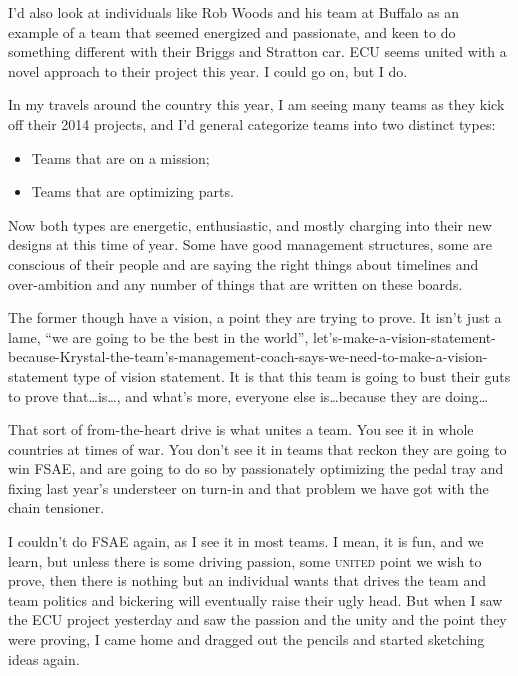 \documentclass[10pt, a4paper, article, oneside, twocolumn, final]{memoir}
\begin{document}
I’d also look at individuals like Rob Woods and his team at Buffalo as an example of a team that seemed energized and passionate, and keen to do something different with their Briggs and Stratton car. ECU seems united with a novel approach to their project this year. I could go on, but I do. 

In my travels around the country this year, I am seeing many teams as they kick off their 2014 projects, and I’d general categorize teams into two distinct types: 

\begin{itemize}
    \item Teams that are on a mission; 
    \item Teams that are optimizing parts. 
\end{itemize}

Now both types are energetic, enthusiastic, and mostly charging into their new designs at this time of year. Some have good management structures, some are conscious of their people and are saying the right things about timelines and over-ambition and any number of things that are written on these boards. 

The former though have a vision, a point they are trying to prove. It isn’t just a lame, “we are going to be the best in the world”, let’s-\allowbreak make-\allowbreak a-\allowbreak vision-\allowbreak statement-\allowbreak because-\allowbreak Krystal-\allowbreak the-\allowbreak team’s-\allowbreak management-\allowbreak coach-\allowbreak says-\allowbreak we-\allowbreak need-\allowbreak to-\allowbreak make-\allowbreak a-\allowbreak vision-\allowbreak statement type of vision statement. It is that this team is going to bust their guts to prove that\ldots is\ldots, and what’s more, everyone else is\ldots because they are doing\ldots

That sort of from-the-heart drive is what unites a team. You see it in whole countries at times of war. You don’t see it in teams that reckon they are going to win FSAE, and are going to do so by passionately optimizing the pedal tray and fixing last year’s understeer on turn-in and that problem we have got with the chain tensioner. 

I couldn’t do FSAE again, as I see it in most teams. I mean, it is fun, and we learn, but unless there is some driving passion, some \textsc{united} point we wish to prove, then there is nothing but an individual wants that drives the team and team politics and bickering will eventually raise their ugly head. But when I saw the ECU project yesterday and saw the passion and the unity and the point they were proving, I came home and dragged out the pencils and started sketching ideas again. 
\end{document}
